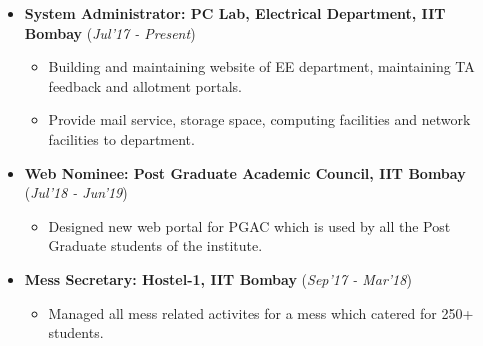 \documentclass[10pt]{article}
\begin{document}
\begin{itemize}[leftmargin=0.4cm]
\vspace{-0.1cm}
\item \textbf {System Administrator: PC Lab, Electrical Department, IIT Bombay} 
\hfill{(\textit{Jul'17 - Present})}\\[-0.6cm]
    \begin{itemize}
	\item Building and maintaining website of EE department, maintaining TA feedback and allotment portals.\vspace{-0.1cm}
	\item Provide mail service, storage space, computing facilities and network facilities to department.\vspace{-0.1cm}

	\end{itemize}
	\vspace{-0.25cm}
	
	
\item \textbf{Web Nominee: Post Graduate Academic Council, IIT Bombay}
\hfill{(\textit{Jul'18 - Jun'19})}\\[-0.65cm]
    \begin{itemize}
			\item Designed new web portal for PGAC which is used by all the Post Graduate students of the institute. \vspace{-0.1cm}
		
		\end{itemize}
		\vspace{-0.25cm}

\item \textbf{Mess Secretary: Hostel-1, IIT Bombay}
\hfill{(\textit{Sep'17 - Mar'18})}\\[-0.65cm]
    \begin{itemize}
            \item Managed all mess related activites for a mess which catered for 250+ students. \vspace{-0.1cm}

		\end{itemize}
		\vspace{-0.2cm}	


    	
\end{itemize}
\vspace{0.15cm}
\end{document}
